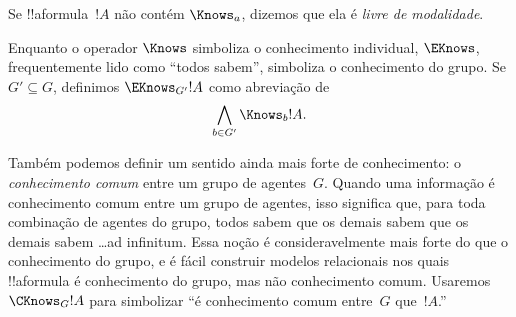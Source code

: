 \documentclass[../../../include/open-logic-section]{subfiles}
\begin{document}
Se !!a{formula}~$!A$ não contém $\Knows_a$, dizemos que ela é
\emph{livre de modalidade}.

\begin{defn}
  Enquanto o operador $\Knows$ simboliza o conhecimento individual,
  $\EKnows$, frequentemente lido como ``todos sabem'', simboliza o
  conhecimento do grupo. Se $G' \subseteq G$, definimos $\EKnows_{G'} !A$
 como abreviação de \[\bigwedge_{b \in G'} \Knows_b !A.\]
\end{defn}

Também podemos definir um sentido ainda mais forte de conhecimento: o
\emph{conhecimento comum} entre um grupo de agentes~$G$. Quando uma
informação é conhecimento comum entre um grupo de agentes, isso
significa que, para toda combinação de agentes do grupo, todos sabem
que os demais sabem que os demais sabem \dots ad infinitum. Essa noção
é consideravelmente mais forte do que o conhecimento do grupo, e é
fácil construir modelos relacionais nos quais !!a{formula} é
conhecimento do grupo, mas não conhecimento comum. Usaremos
$\CKnows_G !A$ para simbolizar ``é conhecimento comum entre~$G$
que~$!A$.''
\end{document}
